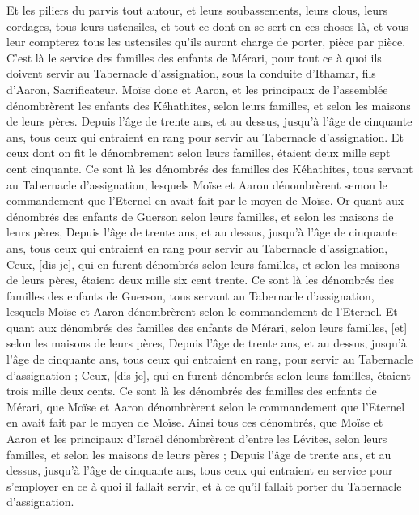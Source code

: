 \begin{multicols}{2}
Et les piliers du parvis tout autour, et leurs soubassements, leurs clous, leurs cordages, tous leurs ustensiles, et tout ce dont on se sert en ces choses-là, et vous leur compterez tous les ustensiles qu'ils auront charge de porter, pièce par pièce.
C'est là le service des familles des enfants de Mérari, pour tout ce à quoi ils doivent servir au Tabernacle d'assignation, sous la conduite d'Ithamar, fils d'Aaron, Sacrificateur.
Moïse donc et Aaron, et les principaux de l'assemblée dénombrèrent les enfants des Kéhathites, selon leurs familles, et selon les maisons de leurs pères.
Depuis l'âge de trente ans, et au dessus, jusqu'à l'âge de cinquante ans, tous ceux qui entraient en rang pour servir au Tabernacle d'assignation.
Et ceux dont on fit le dénombrement selon leurs familles, étaient deux mille sept cent cinquante.
Ce sont là les dénombrés des familles des Kéhathites, tous servant au Tabernacle d'assignation, lesquels Moïse et Aaron dénombrèrent semon le commandement que l'Eternel en avait fait par le moyen de Moïse.
Or quant aux dénombrés des enfants de Guerson selon leurs familles, et selon les maisons de leurs pères,
Depuis l'âge de trente ans, et au dessus, jusqu'à l'âge de cinquante ans, tous ceux qui entraient en rang pour servir au Tabernacle d'assignation,
Ceux, [dis-je], qui en furent dénombrés selon leurs familles, et selon les maisons de leurs pères, étaient deux mille six cent trente.
Ce sont là les dénombrés des familles des enfants de Guerson, tous servant au Tabernacle d'assignation, lesquels Moïse et Aaron dénombrèrent selon le commandement de l'Eternel.
Et quant aux dénombrés des familles des enfants de Mérari, selon leurs familles, [et] selon les maisons de leurs pères,
Depuis l'âge de trente ans, et au dessus, jusqu'à l'âge de cinquante ans, tous ceux qui entraient en rang, pour servir au Tabernacle d'assignation ;
Ceux, [dis-je], qui en furent dénombrés selon leurs familles, étaient trois mille deux cents.
Ce sont là les dénombrés des familles des enfants de Mérari, que Moïse et Aaron dénombrèrent selon le commandement que l'Eternel en avait fait par le moyen de Moïse.
Ainsi tous ces dénombrés, que Moïse et Aaron et les principaux d'Israël dénombrèrent d'entre les Lévites, selon leurs familles, et selon les maisons de leurs pères ;
Depuis l'âge de trente ans, et au dessus, jusqu'à l'âge de cinquante ans, tous ceux qui entraient en service pour s'employer en ce à quoi il fallait servir, et à ce qu'il fallait porter du Tabernacle d'assignation.

\end{multicols}
